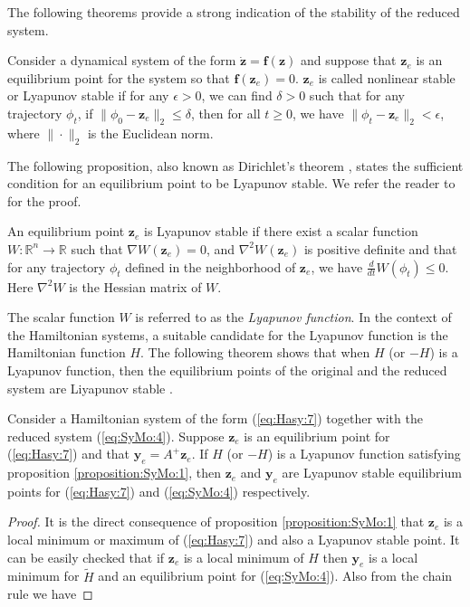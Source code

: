 {\edit 
The following theorems provide a strong indication of the stability of the reduced system. 

\begin{definition} \label{definition:SyMo:1}
Consider a dynamical system of the form $\dot{\mathbf z} = \mathbf f(\mathbf z)$ and suppose that $\mathbf z_e$ is an equilibrium point for the system so that $\mathbf f(\mathbf z_e) = 0$. $\mathbf z_e$ is called nonlinear stable or Lyapunov stable if for any $\epsilon > 0$, we can find $\delta > 0$ such that for any trajectory $\phi_t$, if $\| \phi_0 - \mathbf z_e \|_2 \leq \delta$, then for all $t\geq0$, we have $\| \phi_t - \mathbf z_e \|_2 < \epsilon$, where $\| \cdot \|_2$ is the Euclidean norm.
\end{definition}	
The following proposition, also known as Dirichlet's theorem \cite{bhatia2002stability}, states the sufficient condition for an equilibrium point to be Lyapunov stable. We refer the reader to \cite{bhatia2002stability} for the proof.
\begin{proposition} \label{proposition:SyMo:1}
An equilibrium point $\mathbf z_e$ is Lyapunov stable if there exist a scalar function $W : \mathbb R^{n} \to  \mathbb R$ such that $\nabla W(\mathbf z_e) = 0$, and $\nabla^2 W(\mathbf z_e)$ is positive definite and that for any trajectory $\phi_t$ defined in the neighborhood of $\mathbf z_e$, we have $\frac{d}{dt} W(\phi_t) \leq 0$. Here $\nabla^2W$ is the Hessian matrix of $W$.
\end{proposition}
The scalar function $W$ is referred to as the \emph{Lyapunov function}. In the context of the Hamiltonian systems, a suitable candidate for the Lyapunov function is the Hamiltonian function $H$. The following theorem shows that when $H$ (or $-H$) is a Lyapunov function, then the equilibrium points of the original and the reduced system are Liyapunov stable \cite{abraham1978foundations}. 
\begin{theorem} \label{theorem:SyMo:1}
Consider a Hamiltonian system of the form (\ref{eq:Hasy:7}) together with the reduced system (\ref{eq:SyMo:4}). Suppose $\mathbf z_e$ is an equilibrium point for (\ref{eq:Hasy:7}) and that $\mathbf y_e = A^+\mathbf z_e$. If $H$ (or $-H$) is a Lyapunov function satisfying proposition \ref{proposition:SyMo:1}, then $\mathbf z_e$ and $\mathbf y_e$ are Lyapunov stable equilibrium points for (\ref{eq:Hasy:7}) and (\ref{eq:SyMo:4}) respectively. 
\end{theorem}
\begin{proof}
	It is the direct consequence of proposition \ref{proposition:SyMo:1} that $\mathbf z_e$ is a local minimum or maximum of (\ref{eq:Hasy:7}) and also a Lyapunov stable point. It can be easily checked that if $\mathbf z_e$ is a local minimum of $H$ then $\mathbf y_e$ is a local minimum for $\tilde H$ and an equilibrium point for (\ref{eq:SyMo:4}). Also from the chain rule we have

\end{proof}}
